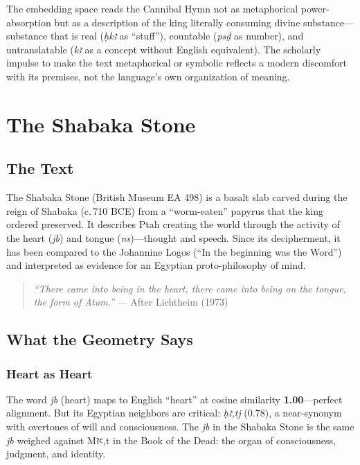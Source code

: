 \documentclass[11pt, a4paper]{article}
\begin{document}
The embedding space reads the Cannibal Hymn not as metaphorical power-absorption but as a description of the king literally consuming divine substance---substance that is real (\textit{ḥkꜣ} as ``stuff''), countable (\textit{psḏ} as number), and untranslatable (\textit{kꜣ} as a concept without English equivalent). The scholarly impulse to make the text metaphorical or symbolic reflects a modern discomfort with its premises, not the language's own organization of meaning.

\section{The Shabaka Stone}
\label{sec:shabaka}

\subsection{The Text}

The Shabaka Stone (British Museum EA 498) is a basalt slab carved during the reign of Shabaka (c.\,710 BCE) from a ``worm-eaten'' papyrus that the king ordered preserved. It describes Ptah creating the world through the activity of the heart (\textit{jb}) and tongue (\textit{ns})---thought and speech. Since its decipherment, it has been compared to the Johannine Logos (``In the beginning was the Word'') and interpreted as evidence for an Egyptian proto-philosophy of mind.

\begin{quote}
\textit{``There came into being in the heart, there came into being on the tongue, the form of Atum.''} --- After Lichtheim (1973)
\end{quote}

\subsection{What the Geometry Says}

\subsubsection{Heart as Heart}

The word \textit{jb} (heart) maps to English ``heart'' at cosine similarity \textbf{1.00}---perfect alignment. But its Egyptian neighbors are critical: \textit{ḥꜣ,tj} (0.78), a near-synonym with overtones of will and consciousness. The \textit{jb} in the Shabaka Stone is the same \textit{jb} weighed against Mꜣꜥ,t in the Book of the Dead: the organ of consciousness, judgment, and identity.
\end{document}
